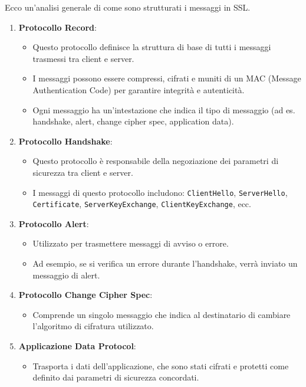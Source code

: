 \documentclass{article}
\theoremstyle{definition}
\begin{document}
Ecco un'analisi generale di come sono strutturati i messaggi in SSL.
\begin{enumerate}
    \item \textbf{Protocollo Record}:
    \begin{itemize}
        \item Questo protocollo definisce la struttura di base di tutti i messaggi trasmessi tra client e server.
        \item I messaggi possono essere compressi, cifrati e muniti di un MAC (Message Authentication Code) per garantire integrità e autenticità.
        \item Ogni messaggio ha un'intestazione che indica il tipo di messaggio (ad es. handshake, alert, change cipher spec, application data).
    \end{itemize}

    \item \textbf{Protocollo Handshake}:
    \begin{itemize}
        \item Questo protocollo è responsabile della negoziazione dei parametri di sicurezza tra client e server.
        \item I messaggi di questo protocollo includono: \texttt{ClientHello}, \texttt{ServerHello}, \texttt{Certificate}, \texttt{ServerKeyExchange}, \texttt{ClientKeyExchange}, ecc.
    \end{itemize}

    \item \textbf{Protocollo Alert}:
    \begin{itemize}
        \item Utilizzato per trasmettere messaggi di avviso o errore.
        \item Ad esempio, se si verifica un errore durante l'handshake, verrà inviato un messaggio di alert.
    \end{itemize}

    \item \textbf{Protocollo Change Cipher Spec}:
    \begin{itemize}
        \item Comprende un singolo messaggio che indica al destinatario di cambiare l'algoritmo di cifratura utilizzato.
    \end{itemize}

    \item \textbf{Applicazione Data Protocol}:
    \begin{itemize}
        \item Trasporta i dati dell'applicazione, che sono stati cifrati e protetti come definito dai parametri di sicurezza concordati.
    \end{itemize}
\end{enumerate}
\end{document}
